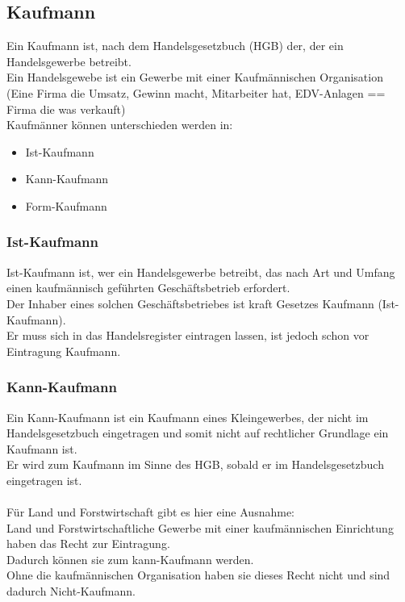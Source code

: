\documentclass[asp1.tex]{subfiles}
\begin{document}
\subsection{Kaufmann}
Ein Kaufmann ist, nach dem Handelsgesetzbuch (HGB) der, der ein Handelsgewerbe betreibt. \\
Ein Handelsgewebe ist ein Gewerbe mit einer Kaufmännischen Organisation\\
(Eine Firma die Umsatz, Gewinn macht, Mitarbeiter hat, EDV-Anlagen == Firma die was verkauft) \\
Kaufmänner können unterschieden werden in:
\begin{itemize}
    \item Ist-Kaufmann
    \item Kann-Kaufmann
    \item Form-Kaufmann
\end{itemize}

\subsubsection{Ist-Kaufmann}
Ist-Kaufmann ist, wer ein Handelsgewerbe betreibt, das nach Art und Umfang einen kaufmännisch geführten Geschäftsbetrieb erfordert. \\
Der Inhaber eines solchen Geschäftsbetriebes ist kraft Gesetzes Kaufmann (Ist-Kaufmann). \\
Er muss sich in das Handelsregister eintragen lassen, ist jedoch schon vor Eintragung Kaufmann.

\subsubsection{Kann-Kaufmann}
Ein Kann-Kaufmann ist ein Kaufmann eines Kleingewerbes, der nicht im Handelsgesetzbuch eingetragen und somit nicht auf rechtlicher Grundlage ein Kaufmann ist. \\
Er wird zum Kaufmann im Sinne des HGB, sobald er im Handelsgesetzbuch eingetragen ist. \\ \\
Für Land und Forstwirtschaft gibt es hier eine Ausnahme: \\
Land und Forstwirtschaftliche Gewerbe mit einer kaufmännischen Einrichtung haben das Recht zur Eintragung. \\
Dadurch können sie zum kann-Kaufmann werden. \\
Ohne die kaufmännischen Organisation haben sie dieses Recht nicht und sind dadurch Nicht-Kaufmann.
\end{document}
